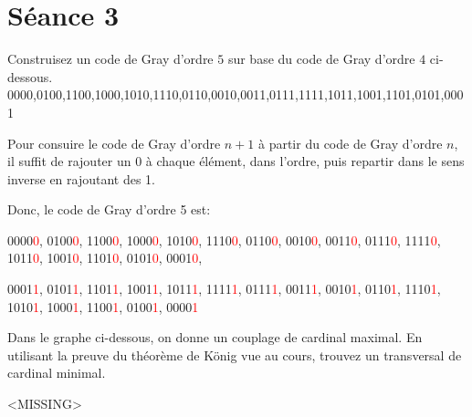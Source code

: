 
\section{Séance 3}

\vspace*{1cm}

\begin{exo}
Construisez un code de Gray d'ordre $5$ sur base du code de Gray d'ordre $4$ ci-dessous.\\
0000,0100,1100,1000,1010,1110,0110,0010,0011,0111,1111,1011,1001,1101,0101,0001
\end{exo}

Pour consuire le code de Gray d'ordre $n+1$ à partir du code de Gray d'ordre $n$, il suffit de rajouter un 0 à chaque élément, dans l'ordre, puis repartir dans le sens inverse en rajoutant des 1.

Donc, le code de Gray d'ordre 5 est: 

0000\textcolor{red}{0}, 0100\textcolor{red}{0}, 1100\textcolor{red}{0}, 1000\textcolor{red}{0}, 1010\textcolor{red}{0}, 1110\textcolor{red}{0}, 0110\textcolor{red}{0}, 0010\textcolor{red}{0}, 0011\textcolor{red}{0}, 0111\textcolor{red}{0}, 1111\textcolor{red}{0}, 1011\textcolor{red}{0}, 1001\textcolor{red}{0}, 1101\textcolor{red}{0}, 0101\textcolor{red}{0}, 0001\textcolor{red}{0}, 

0001\textcolor{red}{1}, 0101\textcolor{red}{1}, 1101\textcolor{red}{1}, 1001\textcolor{red}{1}, 1011\textcolor{red}{1}, 1111\textcolor{red}{1}, 0111\textcolor{red}{1}, 0011\textcolor{red}{1}, 0010\textcolor{red}{1}, 0110\textcolor{red}{1}, 1110\textcolor{red}{1}, 1010\textcolor{red}{1}, 1000\textcolor{red}{1}, 1100\textcolor{red}{1}, 0100\textcolor{red}{1}, 0000\textcolor{red}{1}

\begin{exo}
Dans le graphe ci-dessous, on donne un couplage de cardinal maximal. En utilisant la preuve du th\'eor\`eme de K\"onig vue au cours, trouvez un transversal de cardinal minimal.
\end{exo}

\begin{figure}[!h]
\begin{center}

\end{center}
\caption{}
\end{figure}

<MISSING>

\newpage


